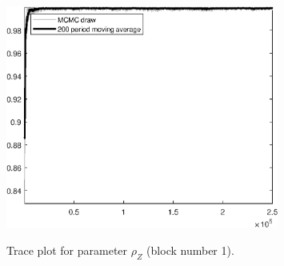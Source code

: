 \begin{figure}[H]
\centering
  \includegraphics[width=0.8\textwidth]{BRS/graphs/TracePlot_rho_Z_blck_1}\\
    \caption{Trace plot for parameter ${\rho_Z}$ (block number 1).}
\end{figure}
